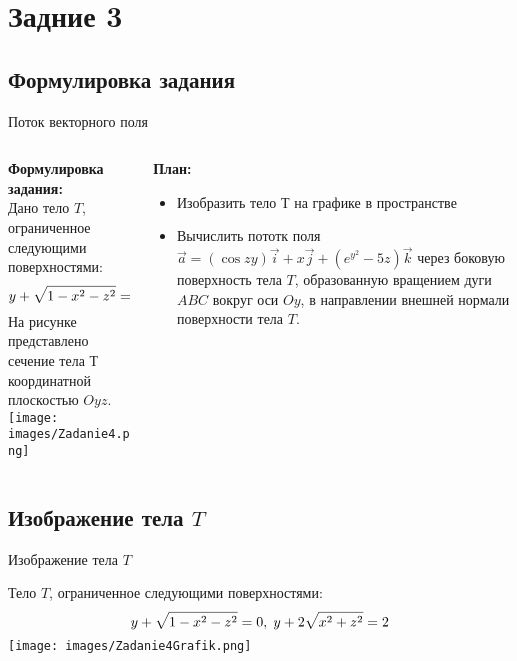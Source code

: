 \section{Задние 3}
\subsection{Формулировка задания}
\begin{frame}{Поток векторного поля} %
\begin{columns}
\begin{column}{0.4\paperwidth}
\centering
\textbf{Формулировка задания:} \\
Дано тело $T$, ограниченное следующими поверхностями: \\
$$y + \sqrt{1 - x^{2} - z^{2}} = 0, \hspace{1mm} y + 2\sqrt{x^{2} + z^{2}} = 2$$ 
На рисунке представлено сечение тела Т координатной плоскостью $Oyz$. \\
\vspace{2mm}
\texttt{[image: images/Zadanie4.png]}
\end{column}
\begin{column}{0.4\paperwidth}
\textbf{План:}
\begin{itemize}
    \item Изобразить тело Т на графике в пространстве
    \item Вычислить пототк поля $\Vec{a} = (\cos{zy})\Vec{i} + x\Vec{j} + (e^{y^{2}} - 5z)\Vec{k}$ через боковую поверхность тела $T$, образованную вращением дуги $ABC$ вокруг оси $Oy$, в направлении внешней нормали поверхности тела $T$. 
\end{itemize}
\end{column}
\end{columns}
\end{frame}


\subsection{Изображение тела $T$}
\begin{frame}{Изображение тела $T$}
\begin{block}
\centering
Тело $T$, ограниченное следующими поверхностями: \\
$$y + \sqrt{1 - x^{2} - z^{2}} = 0, \hspace{1mm} y + 2\sqrt{x^{2} + z^{2}} = 2$$ 
\centering
\texttt{[image: images/Zadanie4Grafik.png]}
\end{block} 
\end{frame}

